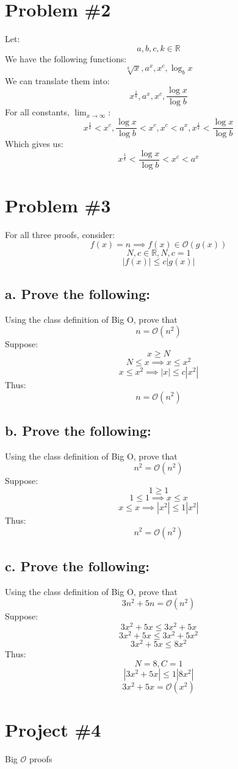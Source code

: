 \documentclass{article}
\newcommand {\R}{\mathbb{R}}
\begin{document}
\section*{Problem \#2}
Let: \[a, b, c, k \in \R \]
We have the following functions: \[ \sqrt[k]{x}, a^x, x^c, \log_b{x} \]
We can translate them into: \[ x^\frac{1}{k}, a^x, x^c, \frac{\log{x}}{\log{b}} \]
For all constants, \(\lim_{x\to\infty}\): \[
    x^\frac{1}{k} < x^c,
    \frac{\log{x}}{\log{b}} < x^c,
    x^c < a^x,
    x^\frac{1}{k} < \frac{\log{x}}{\log{b}}
\]
Which gives us: \[ x^\frac{1}{k} < \frac{\log{x}}{\log{b}} < x^c < a^x \]

\section*{Problem \#3}
For all three proofs, consider:
\[ f(x) = n \implies f(x) \in \mathcal{O}(g(x)) \]
\[ N, c \in \R, N, c = 1 \]
\[ |f(x)| \leq c|g(x)| \]
\subsection*{a. Prove the following:}
Using the class definition of Big O, prove that \[ n = \mathcal{O}(n^2) \]
Suppose:
\[x \geq N \]
\[N \leq x \implies x \leq x^2 \]
\[x \leq x^2 \implies |x| \leq c|x^2| \]
Thus:
\[n = \mathcal{O}(n^2) \]
\subsection*{b. Prove the following:}
Using the class definition of Big O, prove that \[ n^2 = \mathcal{O}(n^2) \]
Suppose:
\[1 \geq 1 \]
\[1 \leq 1 \implies x \leq x \]
\[x \leq x \implies |x^2| \leq 1|x^2| \]
Thus:
\[n^2 = \mathcal{O}(n^2) \]
\subsection*{c. Prove the following:}
Using the class definition of Big O, prove that \[ 3n^2 + 5n = \mathcal{O}(n^2) \]
Suppose:
\[3x^2 + 5x \leq 3x^2 + 5x \]
\[3x^2 + 5x \leq 3x^2 + 5x^2 \]
\[3x^2 + 5x \leq 8x^2 \]
Thus:
\[N = 8, C = 1\]
\[|3x^2 + 5x| \leq 1|8x^2|\]
\[3x^2 + 5x = \mathcal{O}(x^2)\]

\section*{Project \#4}
Big \(\mathcal{O}\) proofs
\end{document}
